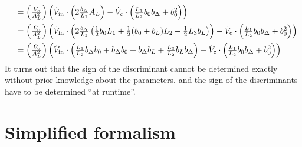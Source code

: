 \begin{equation}
\begin{array}{lll}
    \\\addlinespace
    &=   \left( \frac{\Vc}{\AL^2} \right)     
      \left(       
      \Vin  \cdot  \left(
      2 \frac{\bDelta}{L_2} \AL
      \right)
      - \Vc
      \cdot \left(      
      \frac{L_1}{L_2}  b_0\bDelta        
      + b_0^2                   
      \right)     
      \right)      
    \\\addlinespace
    &=
      \left( \frac{\Vc}{\AL^2} \right)     
      \left(       
      \Vin  \cdot  \left(
      2 \frac{\bDelta}{L_2}
      \left(
      \frac{1}{2} b_0  L_1 
      +  \frac{1}{2} (b_0 + b_L) L_2 
      + \frac{1}{2} L_3\bL        
      \right)      
      \right)
      - \Vc
      \cdot \left(      
      \frac{L_1}{L_2}  b_0\bDelta        
      + b_0^2                   
      \right)     
      \right)
    \\\addlinespace
    &=
      \left( \frac{\Vc}{\AL^2} \right)     
      \left(       
      \Vin  \cdot  \left(
      \frac{L_1 }{L_2} \bDelta b_0
      + \bDelta b_0
      + \bDelta b_L
      + \frac{L_3}{L_2} b_L \bDelta
      \right)          
      - \Vc
      \cdot \left(      
      \frac{L_1}{L_2}  b_0\bDelta        
      + b_0^2                   
      \right)
      \right)
  \end{array}
\end{equation}
It turns out that the sign of the discriminant cannot be determined exactly without prior knowledge about the 
parameters. and the sign of the discriminants have to be determined ``at runtime''.
\section*{Simplified formalism}


